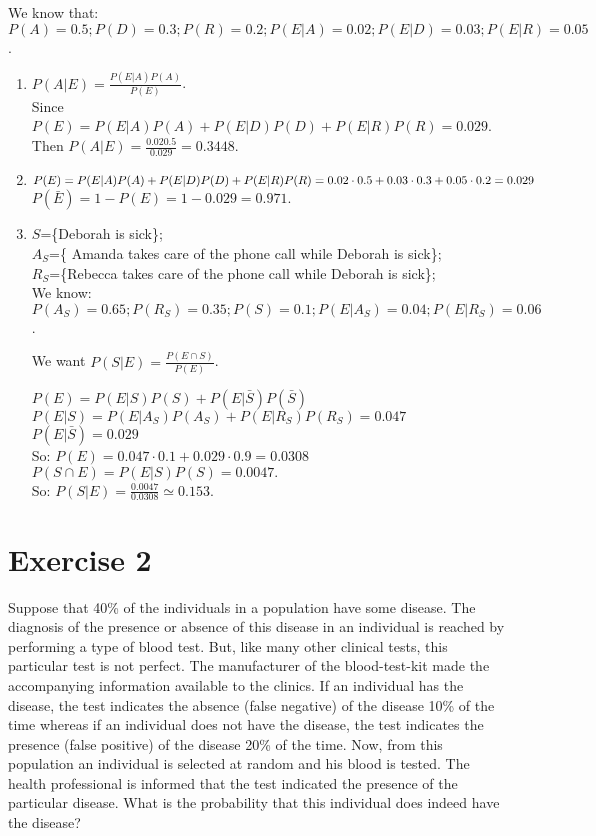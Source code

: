 \documentclass[12pt,thmsa]{article}\usepackage[]{graphicx}\usepackage[]{color}
\begin{document}
We know that: $P(A)=0.5; P(D)=0.3; P(R)=0.2; P(E \vert A)=0.02; P(E \vert D)=0.03; P(E \vert R)=0.05$.

\begin{enumerate}
  \item $P(A \vert E)= \frac{P(E\vert A) P(A)}{P(E)}$.  \\
  Since $P(E)=P(E \vert A) P(A)+ P(E \vert D) P(D)+ P(E \vert R) P(R)=0.029$. \\
  Then $P(A \vert E)=\frac{0.02 0.5}{0.029}=0.3448$.

  \item $P(E)=P(E \vert A)P(A)+P(E \vert D) P(D)+P(E \vert R) P(R)\\= 0.02\cdot0.5+0.03\cdot 0.3+0.05\cdot 0.2=0.029$\\
$P(\bar{E})=1-P(E)=1-0.029=0.971$.


  \item  $S$=\{Deborah is sick\}; \\
$A_S$=\{ Amanda takes care of the phone call while Deborah is sick\}; \\
$R_S$=\{Rebecca takes care of the phone call while Deborah is sick\}; \\

We know: $P(A_S)=0.65; P(R_S)=0.35; P(S)=0.1; P(E \vert A_S)=0.04; P(E \vert R_S)=0.06$.

We want $P(S \vert E)=  \frac{P(E \cap S)}{P(E)}$.

$P(E)=P(E \vert S)P(S)+P(E \vert \bar{S}) P(\bar{S})$\\
$P(E \vert S)=P(E \vert A_S) P(A_S) + P(E\vert R_S) P(R_S) =0.047$\\
$P(E \vert \bar{S})= 0.029$\\
So: $P(E)= 0.047 \cdot 0.1 + 0.029 \cdot 0.9= 0.0308$\\
$P(S \cap E) = P(E \vert S) P(S)= 0.0047.$\\
So: $P(S \vert E)= \frac{0.0047}{0.0308}\simeq 0.153$.

\end{enumerate}

\section*{Exercise 2}

Suppose that 40\% of the individuals in a population have some disease. The diagnosis of the presence or absence of this disease in an individual is reached by performing a type of blood test. But, like many other clinical tests, this particular test is not perfect. The manufacturer of the blood-test-kit made the accompanying information available to the clinics. If an individual has the disease, the test indicates the absence (false negative) of the disease 10\% of the time whereas if an individual does not have the disease, the test indicates the presence (false positive) of the disease 20\% of the time. Now, from this population an individual is selected at random and his blood is tested. The health professional is informed that the test indicated the presence of the particular disease. What is the probability that this individual does indeed have the disease?
\end{document}
